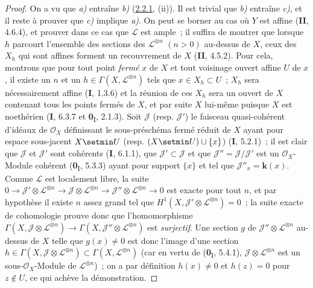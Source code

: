 \begin{proof}
On a vu que \emph{a)} entraîne \emph{b)} (\hyperref[III.2.2.1-fr]{2.2.1}, (ii)). Il
est trivial que \emph{b)} entraîne \emph{c)}, et il reste à prouver que \emph{c)} implique
\emph{a)}. On peut se borner au cas où $Y$ est affine (\textbf{II}, 4.6.4), et prouver
dans ce cas que $\mathcal L$ est ample~; il suffira de montrer que lorsque
$h$ parcourt l'ensemble des sections des $\mathcal L^{\otimes n}$
$(n>0)$ au-dessus de $X$, ceux des $X_h$ qui sont affines forment un
recouvrement de $X$ (\textbf{II}, 4.5.2). Pour cela, montrons que pour tout point
\emph{fermé} $x$ de $X$ et tout voisinage ouvert affine $U$ de $x$, il existe un
$n$ et un $h\in\Gamma(X,\mathcal L^{\otimes n})$ tels que
$x\in X_h\subset U$~; $X_h$ sera nécessairement affine (\textbf{I}, 1.3.6) et la
réunion de ces $X_h$ sera un ouvert de $X$ contenant tous les points
fermés de $X$, et par suite $X$ lui-même puisque $X$ est noethérien
(\textbf{I}, 6.3.7 et \textbf{0}\textsubscript{I}, 2.1.3). Soit $\mathcal J$ (resp.
$\mathcal J'$) le faisceau quasi-cohérent d'idéaux de $\mathcal O_X$
définissant le sous-préschéma fermé réduit de $X$ ayant pour espace
sous-jacent $X\setmin U$ (resp. $(X\setmin U)\cup\{x\}$) (\textbf{I}, 5.2.1)~; il est clair que
$\mathcal J$ et $\mathcal J'$ sont cohérents (\textbf{I}, 6.1.1), que
$\mathcal J'\subset\mathcal J$ et que
$\mathcal J''=\mathcal J/\mathcal J'$ est un $\mathcal O_X$-Module
cohérent (\textbf{0}\textsubscript{I}, 5.3.3) ayant pour support $\{x\}$ et tel
que $\mathcal J''_x=\boldsymbol{k}(x)$. Comme $\mathcal L$ est localement libre, la
suite
$0\to\mathcal J'\otimes\mathcal L^{\otimes n}
\to\mathcal J\otimes\mathcal L^{\otimes n}
\to\mathcal J''\otimes\mathcal L^{\otimes n}\to0$
est exacte pour tout $n$, et par hypothèse il existe $n$ assez grand tel
que $H^1(X,\mathcal J'\otimes\mathcal L^{\otimes n})=0$~; la suite
exacte de cohomologie
prouve donc que l'homomorphisme
$\Gamma(X,\mathcal J\otimes\mathcal L^{\otimes n})
\to
\Gamma(X,\mathcal J''\otimes\mathcal L^{\otimes n})$
est \emph{surjectif}. Une section $g$ de
$\mathcal J''\otimes\mathcal L^{\otimes n}$ au-dessus de $X$ telle que
$g(x)\neq0$ est donc l'image d'une section
$h\in\Gamma(X,\mathcal J\otimes\mathcal L^{\otimes n})
\subset\Gamma(X,\mathcal L^{\otimes n})$ (car en vertu de
(\textbf{0}\textsubscript{I}, 5.4.1),
$\mathcal J\otimes\mathcal L^{\otimes n}$ est un sous-$\mathcal O_X$-Module
de $\mathcal L^{\otimes n}$)~; on a par définition $h(x)\neq0$ et
$h(z)=0$ pour $z\notin U$, ce qui achève la démonstration.
\end{proof}

